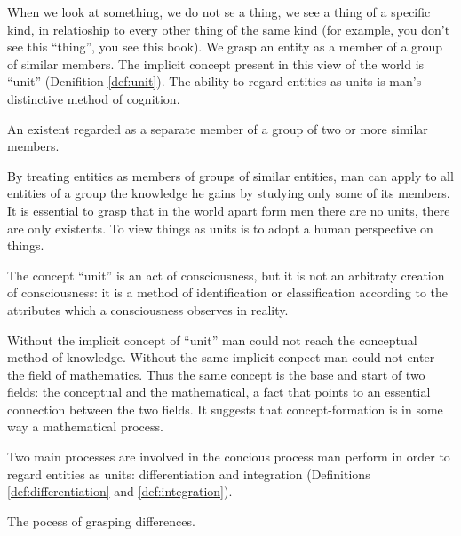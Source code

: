         When we look at something, we do not se a thing, we see a thing of a specific kind, in relatioship to every other thing of the same kind (for example, you don't see this ``thing'', you see this book). We grasp an entity as a member of a group of similar members. The implicit concept present in this view of the world is ``unit'' (Denifition \ref{def:unit}). The ability to regard entities as units is man's distinctive method of cognition.

            \begin{definition}[Unit]
            \label{def:unit}
                An existent regarded as a separate member of a group of two or more similar members.
            \end{definition}

        By treating entities as members of groups of similar entities, man can apply to all entities of a group the knowledge he gains by studying only some of its members. It is essential to grasp that in the world apart form men there are no units, there are only existents. To view things as units is to adopt a human perspective on things.

        The concept ``unit'' is an act of consciousness, but it is not an arbitraty creation of consciousness: it is a method of identification or classification according to the attributes which a consciousness observes in reality. %

        Without the implicit concept of ``unit'' man could not reach the conceptual method of knowledge. Without the same implicit conpect man could not enter the field of mathematics. Thus the same concept is the base and start of two fields: the conceptual and the mathematical, a fact that points to an essential connection between the two fields. It suggests that concept-formation is in some way a mathematical process.

        Two main processes are involved in the concious process man perform in order to regard entities as units: differentiation and integration (Definitions \ref{def:differentiation} and \ref{def:integration}).

            \begin{definition}[Differentiation]
            \label{def:differentiation}
                The pocess of grasping differences.
            \end{definition}

